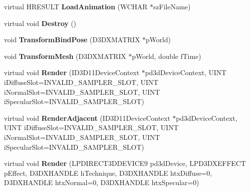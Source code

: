 \begin{DoxyCompactItemize}
\item 
\hypertarget{class_c_d_x_u_t_s_d_k_mesh_ac2b816a9a6692a35e7b6dee9a7297724}{virtual H\+R\+E\+S\+U\+L\+T {\bfseries Load\+Animation} (W\+C\+H\+A\+R $\ast$sz\+File\+Name)}\label{class_c_d_x_u_t_s_d_k_mesh_ac2b816a9a6692a35e7b6dee9a7297724}

\item 
\hypertarget{class_c_d_x_u_t_s_d_k_mesh_a301b8fea720b72609806a9db685d1752}{virtual void {\bfseries Destroy} ()}\label{class_c_d_x_u_t_s_d_k_mesh_a301b8fea720b72609806a9db685d1752}

\item 
\hypertarget{class_c_d_x_u_t_s_d_k_mesh_af033555ff7424a1c72a58d71ae439129}{void {\bfseries Transform\+Bind\+Pose} (D3\+D\+X\+M\+A\+T\+R\+I\+X $\ast$p\+World)}\label{class_c_d_x_u_t_s_d_k_mesh_af033555ff7424a1c72a58d71ae439129}

\item 
\hypertarget{class_c_d_x_u_t_s_d_k_mesh_af1084cedc062d2cd958539c4a428eb8b}{void {\bfseries Transform\+Mesh} (D3\+D\+X\+M\+A\+T\+R\+I\+X $\ast$p\+World, double f\+Time)}\label{class_c_d_x_u_t_s_d_k_mesh_af1084cedc062d2cd958539c4a428eb8b}

\item 
\hypertarget{class_c_d_x_u_t_s_d_k_mesh_a25ee93ec43d95eea6df248ff70da1c4c}{virtual void {\bfseries Render} (I\+D3\+D11\+Device\+Context $\ast$pd3d\+Device\+Context, U\+I\+N\+T i\+Diffuse\+Slot=I\+N\+V\+A\+L\+I\+D\+\_\+\+S\+A\+M\+P\+L\+E\+R\+\_\+\+S\+L\+O\+T, U\+I\+N\+T i\+Normal\+Slot=I\+N\+V\+A\+L\+I\+D\+\_\+\+S\+A\+M\+P\+L\+E\+R\+\_\+\+S\+L\+O\+T, U\+I\+N\+T i\+Specular\+Slot=I\+N\+V\+A\+L\+I\+D\+\_\+\+S\+A\+M\+P\+L\+E\+R\+\_\+\+S\+L\+O\+T)}\label{class_c_d_x_u_t_s_d_k_mesh_a25ee93ec43d95eea6df248ff70da1c4c}

\item 
\hypertarget{class_c_d_x_u_t_s_d_k_mesh_a81354ac0a0c9f6cbf31a0d24cabf7d77}{virtual void {\bfseries Render\+Adjacent} (I\+D3\+D11\+Device\+Context $\ast$pd3d\+Device\+Context, U\+I\+N\+T i\+Diffuse\+Slot=I\+N\+V\+A\+L\+I\+D\+\_\+\+S\+A\+M\+P\+L\+E\+R\+\_\+\+S\+L\+O\+T, U\+I\+N\+T i\+Normal\+Slot=I\+N\+V\+A\+L\+I\+D\+\_\+\+S\+A\+M\+P\+L\+E\+R\+\_\+\+S\+L\+O\+T, U\+I\+N\+T i\+Specular\+Slot=I\+N\+V\+A\+L\+I\+D\+\_\+\+S\+A\+M\+P\+L\+E\+R\+\_\+\+S\+L\+O\+T)}\label{class_c_d_x_u_t_s_d_k_mesh_a81354ac0a0c9f6cbf31a0d24cabf7d77}

\item 
\hypertarget{class_c_d_x_u_t_s_d_k_mesh_a27013a43d78bae84e0023a8dcbfbcc22}{virtual void {\bfseries Render} (L\+P\+D\+I\+R\+E\+C\+T3\+D\+D\+E\+V\+I\+C\+E9 pd3d\+Device, L\+P\+D3\+D\+X\+E\+F\+F\+E\+C\+T p\+Effect, D3\+D\+X\+H\+A\+N\+D\+L\+E h\+Technique, D3\+D\+X\+H\+A\+N\+D\+L\+E htx\+Diffuse=0, D3\+D\+X\+H\+A\+N\+D\+L\+E htx\+Normal=0, D3\+D\+X\+H\+A\+N\+D\+L\+E htx\+Specular=0)}\label{class_c_d_x_u_t_s_d_k_mesh_a27013a43d78bae84e0023a8dcbfbcc22}


\end{DoxyCompactItemize}
